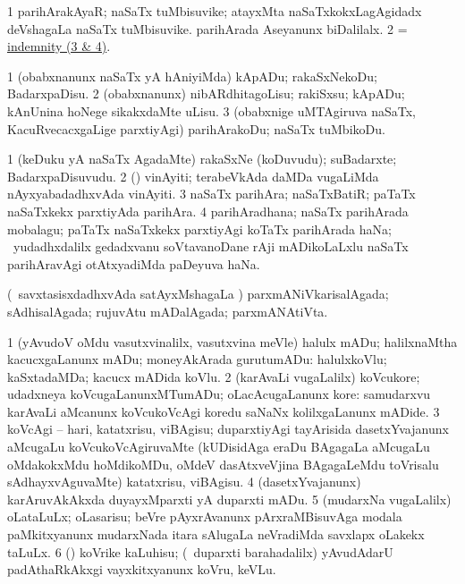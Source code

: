 \bentry
{}
\gl{\nA}
\bmng
\bnum
\num{1} parihArakAyaR; naSaTx tuMbisuvike;  atayxMta naSaTxkokxLagAgidadx deVshagaLa naSaTx tuMbisuvike.  parihArada Aseyanunx biDalilalx. 
\num{2}  = \hyperlink{indemnity(3)}{indemnity (3 \& 4)}. 
\enum
\emng
\eentry

\bentry
{}
\gl{\sakirx}
\bmng
\bnum
\num{1} (obabxnanunx naSaTx yA hAniyiMda) kApADu; rakaSxNekoDu; BadarxpaDisu. 
\num{2} (obabxnanunx) nibARdhitagoLisu; rakiSxsu; kApADu; kAnUnina hoNege sikakxdaMte uLisu. 
\num{3} (obabxnige uMTAgiruva naSaTx, KacuRvecacxgaLige parxtiyAgi) parihArakoDu; naSaTx tuMbikoDu. 
\enum
\emng
\eentry

\bentry
{}
\gl{\nA}
\bmng
\bnum
\num{1} (keDuku yA naSaTx AgadaMte) rakaSxNe (koDuvudu); suBadarxte; BadarxpaDisuvudu. 
\num{2} (\nAyxshA) vinAyiti; terabeVkAda daMDa \mo vugaLiMda nAyxyabadadhxvAda vinAyiti. 
\num{3} naSaTx parihAra; naSaTxBatiR; paTaTx naSaTxkekx parxtiyAda parihAra. 
\hypertarget{indemnity(3)}{} 
\num{4} parihAradhana; naSaTx parihArada mobalagu; paTaTx naSaTxkekx parxtiyAgi koTaTx parihArada haNa; \kanmu\ yudadhxdalilx gedadxvanu soVtavanoDane rAji mADikoLaLxlu naSaTx parihAravAgi otAtxyadiMda paDeyuva haNa. 
\enum
\emng
\eentry

\bentry
{}
\gl{\gu}
\bmng
(\kanmu\ savxtasisxdadhxvAda satAyxMshagaLa \vi) parxmANiVkarisalAgada; sAdhisalAgada; rujuvAtu mADalAgada; parxmANAtiVta. 
\emng
\eentry

\bentry
{}
\gl{\sakirx}
\bmng
\bnum
\num{1} (yAvudoV oMdu vasutxvinalilx, vasutxvina meVle) halulx mADu; halilxnaMtha kacucxgaLanunx mADu; moneyAkArada gurutumADu:  halulxkoVlu; kaSxtadaMDa; kacucx mADida koVlu. 
\num{2} (karAvaLi \mo vugaLalilx) koVcukore; udadxneya koVcugaLanunxMTumADu; oLacAcugaLanunx kore:  samudarxvu karAvaLi aMcanunx koVcukoVcAgi koredu saNaNx kolilxgaLanunx mADide. 
\num{3} koVcAgi -- hari, katatxrisu, viBAgisu; duparxtiyAgi tayArisida dasetxYvajanunx aMcugaLu koVcukoVcAgiruvaMte (kUDisidAga eraDu BAgagaLa aMcugaLu oMdakokxMdu hoMdikoMDu, oMdeV dasAtxveVjina BAgagaLeMdu toVrisalu sAdhayxvAguvaMte) katatxrisu, viBAgisu. 
\num{4} (dasetxYvajanunx) karAruvAkAkxda duyayxMparxti yA duparxti mADu. 
\num{5} (mudarxNa \mo vugaLalilx) oLataLuLx; oLasarisu; beVre pAyxrAvanunx pArxraMBisuvAga modala paMkitxyanunx mudarxNada itara sAlugaLa neVradiMda savxlapx oLakekx taLuLx. 
\num{6} (\birx) koVrike kaLuhisu; (\sA\ duparxti barahadalilx) yAvudAdarU padAthaRkAkxgi vayxkitxyanunx koVru, keVLu. 
\enum
\emng

